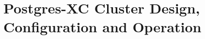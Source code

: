 \documentclass[10pt,a4paper]{book}
\newcommand{\XC}{Postgres-XC}
\begin{document}









%
%
\part{\label{part:pgxcCtl}Postgres-XC Cluster Design, Configuration and Operation}


\end{document}
